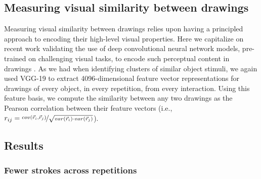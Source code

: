 \documentclass[10pt,letterpaper]{article}
\begin{document}



\subsection{Measuring visual similarity between drawings}

Measuring visual similarity between drawings relies upon having a principled approach to encoding their high-level visual properties.
Here we capitalize on recent work validating the use of deep convolutional neural network models, pre-trained on challenging visual tasks, to encode such perceptual content in drawings \cite{FanCommon2018}.
As we had when identifying clusters of similar object stimuli, we again used VGG-19 to extract 4096-dimensional feature vector representations for drawings of every object, in every repetition, from every interaction. 
Using this feature basis, we compute the similarity between any two drawings as the Pearson correlation between their feature vectors (i.e., $r_{ij} =  \nicefrac{cov(\vec{r}_{i}, \vec{r}_{j})}{\sqrt{var(\vec{r}_{i}) \cdot var(\vec{r}_{j})}}$).

\subsection{Results}
\subsubsection{Fewer strokes across repetitions} 
\end{document}
